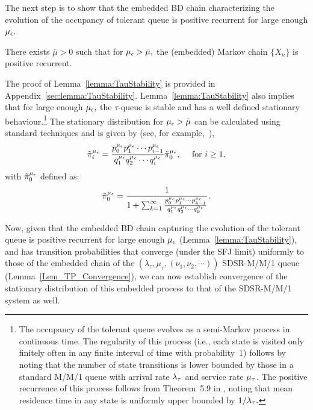 The next step is to show that the embedded BD chain characterizing the
evolution of the occupancy of tolerant queue is positive recurrent for
large enough ${\mu_\epsilon}.$
%
\begin{lemma}
  \label{lemma:TauStability}
  There exists $\bar{\mu} > 0$ such that for ${\mu_\epsilon} > \bar{\mu},$ the
  (embedded) Markov chain $\{X_n\}$ is positive recurrent.
\end{lemma}
The proof of Lemma~\ref{lemma:TauStability} is provided in
Appendix~\ref{sec:lemma:TauStability}. Lemma~\ref{lemma:TauStability}
also implies that for large enough ${\mu_\epsilon},$ the $\tau$-queue is stable
and has a well defined stationary behaviour.\footnote{The occupancy of
  the tolerant queue evolves as a semi-Markov process in continuous
  time. The regularity of this process (i.e., each state is visited
  only finitely often in any finite interval of time with
  probability~1) follows by noting that the number of state
  transitions is lower bounded by those in a standard M/M/1 queue with
  arrival rate $\lambda_{\tau}$ and service rate $\mu_{\tau}$. The positive
  recurrence of this process follows from Theorem~5.9 in
  \cite{Gallager2012}, noting that mean residence time in any state is
  uniformly upper bounded by $1/\lambda_{\tau}.$} The stationary
distribution for ${\mu_\epsilon} > \bar{\mu}$ can be calculated using standard
techniques and is given by (see, for example,~\cite{Hoel}),
\begin{eqnarray}
\label{Eqn_SD_pre-limit}
\tilde{\pi}_i^\mue = \frac{p_0^\mue p_1^\mue \cdots p_{i-1}^\mue}{q_1^\mue q_2^\mue \cdots q_i^\mue} \tilde{\pi}_0^\mue, \ \ \ \ \mbox{for} \ i \geq 1,
\end{eqnarray}with $\tilde{\pi}_0^{\mu_\epsilon}$  defined as:
\begin{equation}
\label{Eqn_pi_0_pre-limit}
\tilde{\pi}_0^{\mu_\epsilon} = \frac{1}{1 + \sum_{k = 1}^\infty \frac{p_0^{\mu_\epsilon} p_1^{\mu_\epsilon} \cdots p_{k-1}^{\mu_\epsilon}}{q_1^{\mu_\epsilon} q_2^{\mu_\epsilon} \cdots q_k^{\mu_\epsilon}}}.
\end{equation}
%

Now, given that the embedded BD chain capturing the evolution of the
tolerant queue is positive recurrent for large enough ${\mu_\epsilon}$
(Lemma~\ref{lemma:TauStability}), and has transition probabilities
that converge (under the SFJ limit) uniformly to those of the embedded
chain of the $(\lambda_\tau, \mu_\tau, (\nu_1, \nu_2, \cdots ))$
SDSR-M/M/1 queue (Lemma~\ref{Lem_TP_Convergence}), we can now
establish convergence of the stationary distribution of this embedded
process to that of the SDSR-M/M/1 system as well.

